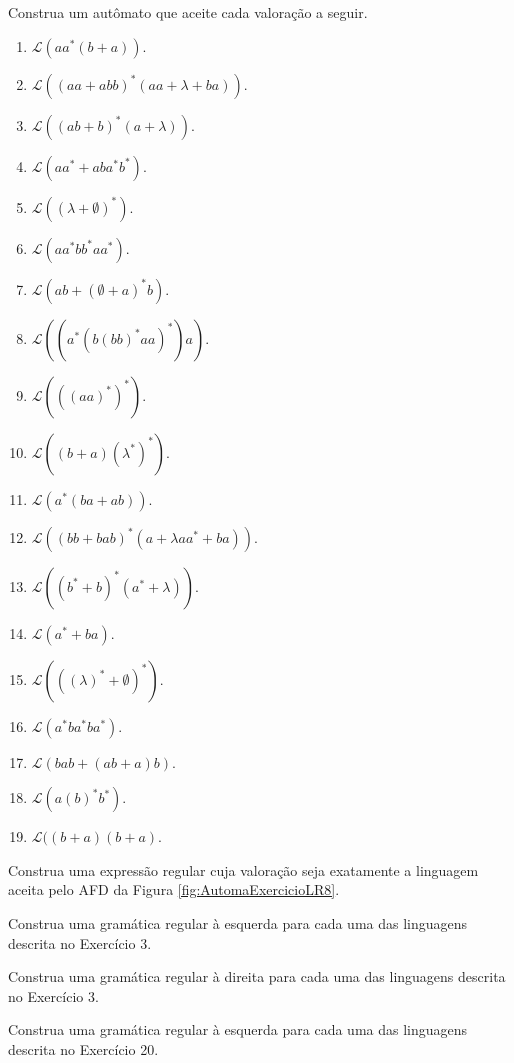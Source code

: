 \begin{problemset}
	\item Construa um autômato que aceite cada valoração a seguir.
	\begin{enumerate}
		\item $\mathcal{L}(aa^*(b + a))$.
		\item $\mathcal{L}((aa + abb)^*(aa + \lambda + ba))$.
		\item $\mathcal{L}((ab + b)^*(a + \lambda))$.
		\item $\mathcal{L}(aa^* + aba^*b^*)$.
		\item $\mathcal{L}((\lambda + \emptyset)^*)$.
		\item $\mathcal{L}(aa^*bb^*aa^*)$.
		\item $\mathcal{L}(ab + (\emptyset + a)^*b)$.
		\item $\mathcal{L}((a^*(b(bb)^*aa)^*)a)$.
		\item $\mathcal{L}(((aa)^*)^*)$.
		\item $\mathcal{L}((b + a)(\lambda^*)^*)$.
		\item $\mathcal{L}(a^*(ba + ab))$.
		\item $\mathcal{L}((bb + bab)^*(a + \lambda aa^* + ba))$.
		\item $\mathcal{L}((b^* + b)^*(a^* + \lambda))$.
		\item $\mathcal{L}(a^* + ba)$.
		\item $\mathcal{L}(((\lambda)^* + \emptyset)^*)$.
		\item $\mathcal{L}(a^*ba^*ba^*)$.
		\item $\mathcal{L}(bab + (ab + a)b)$.
		\item $\mathcal{L}(a(b)^*b^*)$.
		\item $\mathcal{L}((b + a)(b + a)$.
	\end{enumerate}

	\item Construa uma expressão regular cuja valoração seja exatamente a linguagem aceita pelo AFD da Figura \ref{fig:AutomaExercicioLR8}.
	
	\item Construa uma gramática regular à esquerda para cada uma das linguagens descrita no Exercício 3.
	
	\item Construa uma gramática regular à direita para cada uma das linguagens descrita no Exercício 3.
	
	\item Construa uma gramática regular à esquerda para cada uma das linguagens descrita no Exercício 20.
	

\end{problemset}
